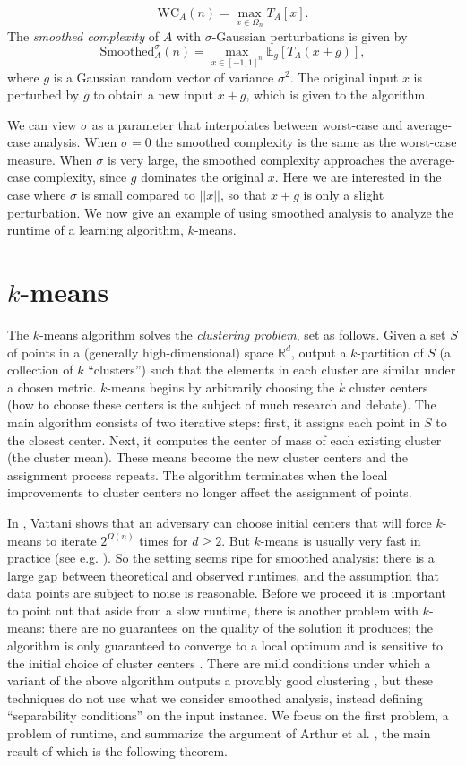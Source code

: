 \documentclass[11pt]{article}
\theoremstyle{definition}
\begin{document}
$$\mbox{WC}_A(n) = \max_{x \in \Omega_n}T_A[x].$$
The \emph{smoothed complexity} of $A$ with $\sigma$-Gaussian perturbations is given by
$$\mbox{Smoothed}_A^{\sigma}(n) = \max_{x\in [-1,1]^n}
\mathbb{E}_g[T_A(x + g)],$$ where $g$ is a Gaussian random vector of
variance $\sigma^2$. The original input $x$ is perturbed by $g$ to
obtain a new input $x + g$, which is given to the algorithm.

We can view $\sigma$ as a parameter that interpolates between
worst-case and average-case analysis. When $\sigma = 0$ the smoothed
complexity is the same as the worst-case measure. When $\sigma$ is
very large, the smoothed complexity approaches the average-case
complexity, since $g$ dominates the original $x$. Here we are
interested in the case where $\sigma$ is small compared to $||x||$, so
that $x + g$ is only a slight perturbation. We now give an example of
using smoothed analysis to analyze the runtime of a learning
algorithm, $k$-means.

\section{$k$-means}
The $k$-means algorithm solves the \emph{clustering problem}, set as
follows. Given a set $S$ of points in a (generally high-dimensional)
space $\mathbb{R}^d$, output a $k$-partition of $S$ (a collection of
$k$ ``clusters'') such that the elements in each cluster are similar
under a chosen metric. $k$-means begins by arbitrarily choosing the
$k$ cluster centers (how to choose these centers is the subject of
much research and debate). The main algorithm consists of two
iterative steps: first, it assigns each point in $S$ to the closest
center. Next, it computes the center of mass of each existing cluster
(the cluster mean). These means become the new cluster centers and the
assignment process repeats. The algorithm terminates when the local
improvements to cluster centers no longer affect the assignment of
points.

In \cite{KMworstcase}, Vattani shows that an adversary can choose
initial centers that will force $k$-means to iterate $2^{\Omega(n)}$
times for $d \ge 2$. But $k$-means is usually very fast in practice
(see e.g. \cite{kmeansfast}). So the setting seems ripe for smoothed
analysis: there is a large gap between theoretical and observed
runtimes, and the assumption that data points are subject to noise is
reasonable. Before we proceed it is important to point out that aside
from a slow runtime, there is another problem with $k$-means: there
are no guarantees on the quality of the solution it produces; the
algorithm is only guaranteed to converge to a local optimum and is
sensitive to the initial choice of cluster centers
\cite{kmeanssensitive}. There are mild conditions under which a
variant of the above algorithm outputs a provably good clustering
\cite{kmeansprovable}, but these techniques do not use what we
consider smoothed analysis, instead defining ``separability
conditions'' on the input instance. We focus on the first problem, a
problem of runtime, and summarize the argument of Arthur et
al. \cite{SAkmeans}, the main result of which is the following
theorem.
\end{document}
